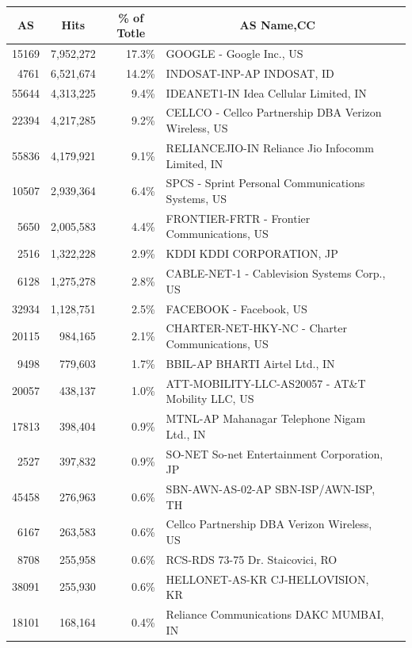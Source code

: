 \begin{table}[]
\begin{tabular}{@{}rrrll@{}}
\toprule
\multicolumn{1}{c}{\textbf{AS}} & \multicolumn{1}{c}{\textbf{Hits}} & \multicolumn{1}{c}{\textbf{\% of Totle}} & \multicolumn{1}{c}{\textbf{AS Name,CC}} &  \\ \midrule
15169 & 7,952,272 & 17.3\% & GOOGLE - Google Inc., US &  \\
4761 & 6,521,674 & 14.2\% & INDOSAT-INP-AP INDOSAT, ID &  \\
55644 & 4,313,225 & 9.4\% & IDEANET1-IN Idea Cellular Limited, IN &  \\ 
22394 & 4,217,285 & 9.2\% & CELLCO - Cellco Partnership DBA Verizon Wireless, US &  \\
55836 & 4,179,921 & 9.1\% & RELIANCEJIO-IN Reliance Jio Infocomm Limited, IN &  \\
10507 & 2,939,364 & 6.4\% & SPCS - Sprint Personal Communications Systems, US &  \\
5650  & 2,005,583 & 4.4\% & FRONTIER-FRTR - Frontier Communications, US &  \\
2516  & 1,322,228 & 2.9\% & KDDI KDDI CORPORATION, JP &  \\
6128  & 1,275,278 & 2.8\% & CABLE-NET-1 - Cablevision Systems Corp., US &  \\
32934 & 1,128,751 & 2.5\% & FACEBOOK - Facebook, US &  \\
20115 & 984,165 & 2.1\% & CHARTER-NET-HKY-NC - Charter Communications, US &  \\
9498  & 779,603 & 1.7\% & BBIL-AP BHARTI Airtel Ltd., IN &  \\
20057 & 438,137 & 1.0\% & ATT-MOBILITY-LLC-AS20057 - AT\&T Mobility LLC, US &  \\
17813 & 398,404 & 0.9\% & MTNL-AP Mahanagar Telephone Nigam Ltd., IN &  \\
2527  & 397,832 & 0.9\% & SO-NET So-net Entertainment Corporation, JP &  \\
45458 & 276,963 & 0.6\% & SBN-AWN-AS-02-AP SBN-ISP/AWN-ISP, TH &  \\
6167  & 263,583 & 0.6\% & Cellco Partnership DBA Verizon Wireless, US &  \\
8708  & 255,958 & 0.6\% & RCS-RDS 73-75 Dr. Staicovici, RO &  \\
38091 & 255,930 & 0.6\% & HELLONET-AS-KR CJ-HELLOVISION, KR &  \\
18101 & 168,164 & 0.4\% & Reliance Communications DAKC MUMBAI, IN &  \\\bottomrule
\end{tabular}
\end{table}



